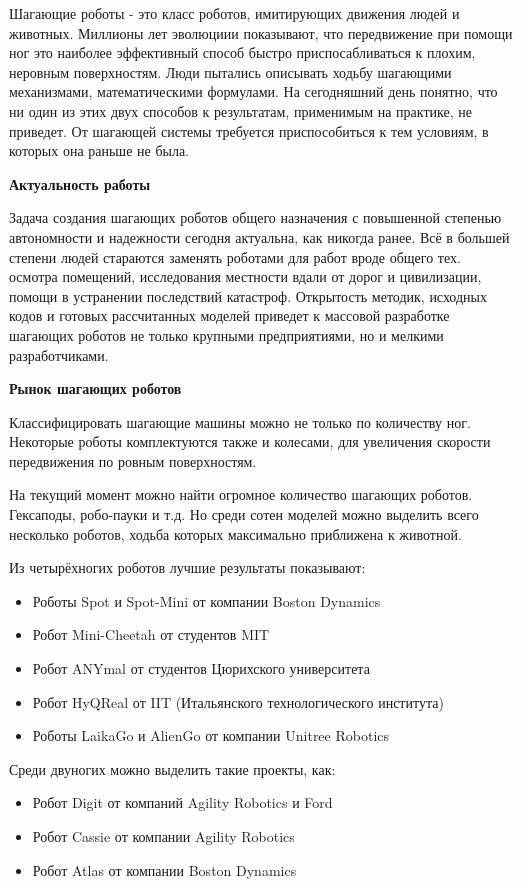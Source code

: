 
Шагающие роботы - это класс роботов, имитирующих движения людей и животных. Миллионы лет эволюциии показывают, что передвижение при помощи ног это наиболее эффективный способ быстро приспосабливаться к плохим, неровным поверхностям. Люди пытались описывать ходьбу шагающими механизмами, математическими формулами. На сегодняшний день понятно, что ни один из этих двух способов к результатам, применимым на практике, не приведет. От шагающей системы требуется приспособиться к тем условиям, в которых она раньше не была.

\textbf{Актуальность работы}

Задача создания шагающих роботов общего назначения с повышенной степенью автономности и надежности сегодня актуальна, как никогда ранее. Всё в большей степени людей стараются заменять роботами для работ вроде общего тех. осмотра помещений, исследования местности вдали от дорог и цивилизации, помощи в устранении последствий катастроф. Открытость методик, исходных кодов и готовых рассчитанных моделей приведет к массовой разработке шагающих роботов не только крупными предприятиями, но и мелкими разработчиками.

\textbf{Рынок шагающих роботов}

Классифицировать шагающие машины можно не только по количеству ног. Некоторые роботы комплектуются также и колесами, для увеличения скорости передвижения по ровным поверхностям. 

На текущий момент можно найти огромное количество шагающих роботов. Гексаподы, робо-пауки и т.д. Но среди сотен моделей можно выделить всего несколько роботов, ходьба которых максимально приближена к животной.

Из четырёхногих роботов лучшие результаты показывают:
\begin{itemize}
    \item Роботы Spot и Spot-Mini от компании Boston Dynamics
    \item Робот Mini-Cheetah от студентов MIT
    \item Робот ANYmal от студентов Цюрихского университета
    \item Робот HyQReal от IIT (Итальянского технологического института)
    \item Роботы LaikaGo и AlienGo от компании Unitree Robotics
\end{itemize}

Среди двуногих можно выделить такие проекты, как:

\begin{itemize}
    \item Робот Digit от компаний Agility Robotics и Ford
    \item Робот Cassie от компании Agility Robotics
    \item Робот Atlas от компании Boston Dynamics
\end{itemize}

